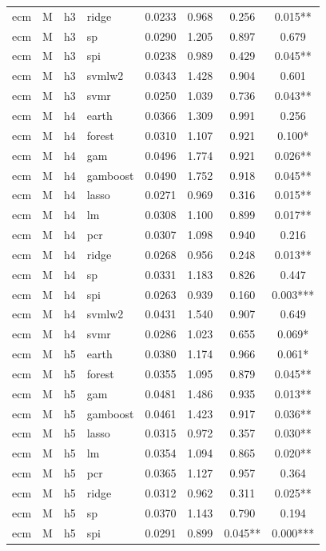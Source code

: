 \begin{ThreePartTable}
\begin{longtable}[t]{llclcccc}
ecm & M & h3 & ridge & 0.0233 & 0.968 & 0.256 & 0.015**\\
ecm & M & h3 & sp & 0.0290 & 1.205 & 0.897 & 0.679\\
ecm & M & h3 & spi & 0.0238 & 0.989 & 0.429 & 0.045**\\
ecm & M & h3 & svmlw2 & 0.0343 & 1.428 & 0.904 & 0.601\\
ecm & M & h3 & svmr & 0.0250 & 1.039 & 0.736 & 0.043**\\
\addlinespace
ecm & M & h4 & earth & 0.0366 & 1.309 & 0.991 & 0.256\\
ecm & M & h4 & forest & 0.0310 & 1.107 & 0.921 & 0.100*\\
ecm & M & h4 & gam & 0.0496 & 1.774 & 0.921 & 0.026**\\
ecm & M & h4 & gamboost & 0.0490 & 1.752 & 0.918 & 0.045**\\
ecm & M & h4 & lasso & 0.0271 & 0.969 & 0.316 & 0.015**\\
ecm & M & h4 & lm & 0.0308 & 1.100 & 0.899 & 0.017**\\
ecm & M & h4 & pcr & 0.0307 & 1.098 & 0.940 & 0.216\\
ecm & M & h4 & ridge & 0.0268 & 0.956 & 0.248 & 0.013**\\
ecm & M & h4 & sp & 0.0331 & 1.183 & 0.826 & 0.447\\
ecm & M & h4 & spi & 0.0263 & 0.939 & 0.160 & 0.003***\\
ecm & M & h4 & svmlw2 & 0.0431 & 1.540 & 0.907 & 0.649\\
ecm & M & h4 & svmr & 0.0286 & 1.023 & 0.655 & 0.069*\\
\addlinespace
ecm & M & h5 & earth & 0.0380 & 1.174 & 0.966 & 0.061*\\
ecm & M & h5 & forest & 0.0355 & 1.095 & 0.879 & 0.045**\\
ecm & M & h5 & gam & 0.0481 & 1.486 & 0.935 & 0.013**\\
ecm & M & h5 & gamboost & 0.0461 & 1.423 & 0.917 & 0.036**\\
ecm & M & h5 & lasso & 0.0315 & 0.972 & 0.357 & 0.030**\\
ecm & M & h5 & lm & 0.0354 & 1.094 & 0.865 & 0.020**\\
ecm & M & h5 & pcr & 0.0365 & 1.127 & 0.957 & 0.364\\
ecm & M & h5 & ridge & 0.0312 & 0.962 & 0.311 & 0.025**\\
ecm & M & h5 & sp & 0.0370 & 1.143 & 0.790 & 0.194\\
ecm & M & h5 & spi & 0.0291 & 0.899 & 0.045** & 0.000***\\

\end{longtable}
\end{ThreePartTable}
